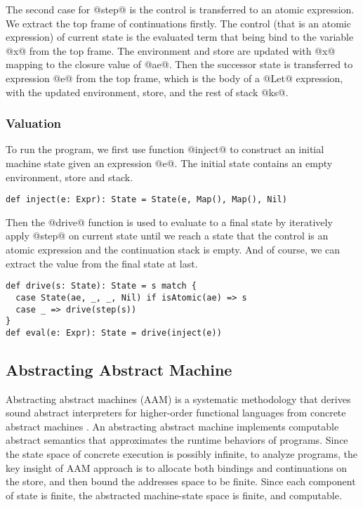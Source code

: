 \documentclass[acmsmall,review,anonymous]{acmart}\settopmatter{printfolios=true,printccs=false,printacmref=false}
\begin{document}
The second case for @step@ is the control is transferred to an atomic expression.
We extract the top frame of continuations firstly.
The control (that is an atomic expression) of current state is the evaluated term
that being bind to the variable @x@ from the top frame.
The environment and store are updated with @x@ mapping to the closure value of @ae@.
Then the successor state is transferred to expression @e@ from the top frame,
which is the body of a @Let@ expression, with the updated environment, store, and
the rest of stack @ks@.

\subsubsection{Valuation}

To run the program, we first use function @inject@ to construct an initial machine
state given an expression @e@. The initial state contains an empty environment, 
store and stack.
\begin{lstlisting}
def inject(e: Expr): State = State(e, Map(), Map(), Nil)
\end{lstlisting}

Then the @drive@ function is used to evaluate
to a final state by iteratively apply @step@ on current state until we reach a state
that the control is an atomic expression and the continuation stack is empty.
And of course, we can extract the value from the final state at last.

\begin{lstlisting}
def drive(s: State): State = s match {
  case State(ae, _, _, Nil) if isAtomic(ae) => s
  case _ => drive(step(s))
}
def eval(e: Expr): State = drive(inject(e))
\end{lstlisting}

\subsection{Abstracting Abstract Machine} \label{aam}
Abstracting abstract machines (AAM) is a systematic methodology that derives sound 
abstract interpreters for higher-order functional languages from concrete 
abstract machines \cite{van2012systematic, van2010abstracting}. 
An abstracting abstract machine implements computable abstract semantics that 
approximates the runtime behaviors of programs.
Since the state space of concrete execution is possibly infinite,
to analyze programs, the key insight of AAM approach is to allocate both bindings
and continuations on the store, and then bound the addresses space to be finite.
Since each component of state is finite, 
the abstracted machine-state space is finite, and computable.
\end{document}
